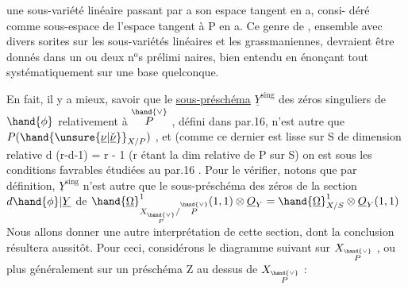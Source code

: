 
une sous-variété linéaire passant par a son espace tangent en a, consi-%
déré comme sous-espace  de l'espace tangent à P en a. Ce genre
\margin{\hand{||}}de , ensemble avec divers sorites sur les sous-variétés linéaires
et les grassmaniennes, devraient être donnés dans un ou deux n$^{\text{o}}$s prélimi
naires, bien entendu en énonçant tout systématiquement sur une base
quelconque.

En fait, il y a mieux, savoir que le \uline{sous-préschéma} $\underline{Y}^{\mathrm{sing}}$
des zéros singuliers de $\hand{\phi}$ relativement à $\overset{\hand{\vee}}{P}$ , défini dans par.16, n'est
autre que $P(\hand{\unsure{\underline{\nu}|\check{\underline{\nu}}}}_{X/P})$ , et (comme ce dernier est lisse sur S de dimension
relative d \unsure{$+$} (r-d-1) = r - 1 (r étant la dim relative de P sur S)
on est sous les conditions favrables étudiées au par.16 .  Pour le vérifier,
notons que par définition, $\underline{Y}^{\mathrm{sing}}$ n'est autre que le sous-préschéma 
des zéros de la section \inserted{$\psi =$} $d\hand{\phi}|\underline{Y}$ de $\hand{\underline{\Omega}}^1_{X_{\overset{\hand{\vee}}{P}}/\overset{\hand{\vee}}{P}}(1,1)\otimes \underline{O}_Y = \hand{\underline{\Omega}}^1_{X/S}\otimes\underline{O}_Y(1,1)$
Nous allons donner une autre interprétation de cette section, dont
la conclusion résultera aussitôt. Pour ceci, considérons le diagramme
 
suivant sur $X_{\overset{\hand{\vee}}{P}}$ , ou plus généralement sur un préschéma Z  au dessus de
$X_{\overset{\hand{\vee}}{P}}$ :

